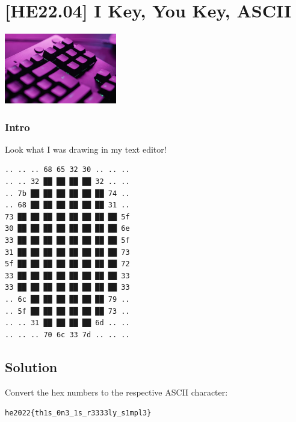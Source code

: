 
\hypertarget{he22.04}{%
\chapter{[HE22.04] I Key, You Key, ASCII}\label{he22.04}}

\begin{marginfigure}
	\includegraphics[width=49mm]{level2/challenge4.jpg}
\end{marginfigure}
\subsection{Intro}

Look what I was drawing in my text editor!

\begin{verbatim}
.. .. .. 68 65 32 30 .. .. ..  
.. .. 32 ██ ██ ██ ██ 32 .. ..  
.. 7b ██ ██ ██ ██ ██ ██ 74 ..  
.. 68 ██ ██ ██ ██ ██ ██ 31 ..  
73 ██ ██ ██ ██ ██ ██ ██ ██ 5f  
30 ██ ██ ██ ██ ██ ██ ██ ██ 6e  
33 ██ ██ ██ ██ ██ ██ ██ ██ 5f  
31 ██ ██ ██ ██ ██ ██ ██ ██ 73  
5f ██ ██ ██ ██ ██ ██ ██ ██ 72  
33 ██ ██ ██ ██ ██ ██ ██ ██ 33  
33 ██ ██ ██ ██ ██ ██ ██ ██ 33  
.. 6c ██ ██ ██ ██ ██ ██ 79 ..  
.. 5f ██ ██ ██ ██ ██ ██ 73 ..  
.. .. 31 ██ ██ ██ ██ 6d .. ..  
.. .. .. 70 6c 33 7d .. .. ..  
\end{verbatim}
  

\section{Solution}\label{hv21.04-solution}

Convert the hex numbers to the respective ASCII character:

\noindent\texttt{he2022\{th1s\_0n3\_1s\_r3333ly\_s1mpl3\}}

